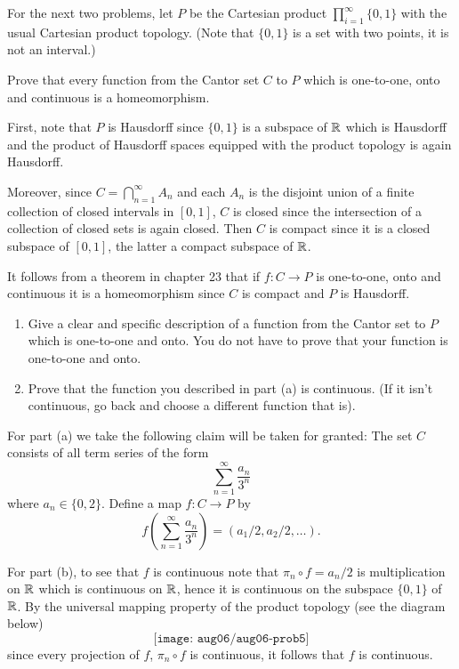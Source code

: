 For the next two problems, let \(P\) be the Cartesian product
\(\prod_{i=1}^\infty\{0,1\}\) with the usual Cartesian product
topology. (Note that \(\{0,1\}\) is a set with two points, it is not an
interval.)
\begin{problem}
  Prove that every function from the Cantor set \(C\) to \(P\) which is
  one-to-one, onto and continuous is a homeomorphism.
\end{problem}
\begin{solution}
  First, note that \(P\) is Hausdorff since \(\{0,1\}\) is a subspace of
  \(\mathbb{R}\) which is Hausdorff and the product of Hausdorff spaces equipped
  with the product topology is again Hausdorff.

  Moreover, since \(C=\bigcap_{n=1}^\infty A_n\) and each \(A_n\) is the
  disjoint union of a finite collection of closed intervals in \([0,1]\),
  \(C\) is closed since the intersection of a collection of closed sets is
  again closed. Then \(C\) is compact since it is a closed subspace of
  \([0,1]\), the latter a compact subspace of \(\mathbb{R}\).

  It follows from a theorem in chapter 23 that if \(f\colon C\to P\) is
  one-to-one, onto and continuous it is a homeomorphism since \(C\) is
  compact and \(P\) is Hausdorff.
\end{solution}

\begin{problem}
  \hfill
  \begin{enumerate}[label=(\alph*),noitemsep]
  \item Give a clear and specific description of a function from the Cantor
    set to \(P\) which is one-to-one and onto. You do not have to prove
    that your function is one-to-one and onto.
  \item Prove that the function you described in part (a) is
    continuous. (If it isn't continuous, go back and choose a different
    function that is).
  \end{enumerate}
\end{problem}
\begin{solution}
  For part (a) we take the following claim will be taken for granted: The
  set \(C\) consists of all term series of the form
  \[
    \sum_{n=1}^\infty\frac{a_n}{3^n}
  \]
  where \(a_n\in\{0,2\}\). Define a map \(f\colon C\to P\) by
  \[
    f\left(\sum_{n=1}^\infty\frac{a_n}{3^n}\right)=(a_1/2,a_2/2,\ldots).
  \]

  For part (b), to see that \(f\) is continuous note that
  \(\pi_n\circ f=a_n/2\) is multiplication on \(\mathbb{R}\) which is continuous
  on \(\mathbb{R}\), hence it is continuous on the subspace \(\{0,1\}\) of
  \(\mathbb{R}\). By the universal mapping property of the product topology (see
  the diagram below)
  \[
    \texttt{[image: aug06/aug06-prob5]}
  \]
  since every projection of \(f\), \(\pi_n\circ f\) is continuous, it
  follows that \(f\) is continuous.
\end{solution}

